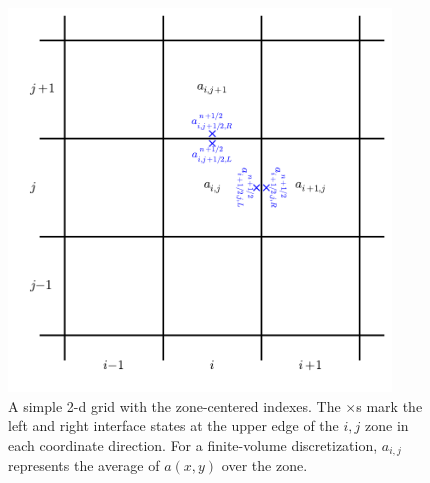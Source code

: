 \begin{figure}[h]
\centering
\includegraphics[width=4.0in]{2dgrid}
\caption[A 2-d grid with zone-centered indexes]{\label{fig:2dgrid} A
  simple 2-d grid with the zone-centered indexes.  The $\times$s mark
  the left and right interface states at the upper edge of the $i,j$ zone in each
  coordinate direction.  For a finite-volume discretization, $a_{i,j}$ 
  represents the average of $a(x,y)$ over the zone.}
\end{figure}


